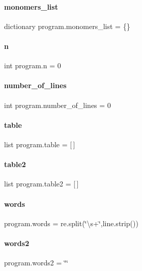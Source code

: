 \paragraph{monomers\+\_\+list}
{\footnotesize\ttfamily dictionary program.\+monomers\+\_\+list = \{\}}

\mbox{\label{namespaceprogram_abf45047966c69469c1b1ae16dddfd97f}} 
\paragraph{n}
{\footnotesize\ttfamily int program.\+n = 0}

\mbox{\label{namespaceprogram_ae6036ca9fde833c1c16f8f29f393b794}} 
\paragraph{number\+\_\+of\+\_\+lines}
{\footnotesize\ttfamily int program.\+number\+\_\+of\+\_\+lines = 0}

\mbox{\label{namespaceprogram_a6ccdb054d60936fb1dc088f02507e1da}} 
\paragraph{table}
{\footnotesize\ttfamily list program.\+table = [$\,$]}

\mbox{\label{namespaceprogram_aeddcddb2b50f3bd08b9a1cfe2bc932ed}} 
\paragraph{table2}
{\footnotesize\ttfamily list program.\+table2 = [$\,$]}

\mbox{\label{namespaceprogram_ae7ae5900685c39ab4a7b31b6768880a1}} 
\paragraph{words}
{\footnotesize\ttfamily program.\+words = re.\+split(\char`\"{}\textbackslash{}s+\char`\"{},line.\+strip())}

\mbox{\label{namespaceprogram_a9027654dd9ae29764677e06a8f983752}} 
\paragraph{words2}
{\footnotesize\ttfamily program.\+words2 = \char`\"{}\char`\"{}}

